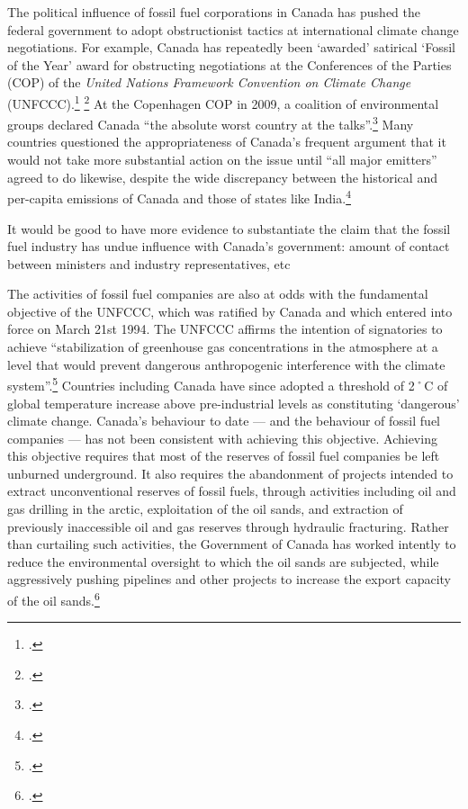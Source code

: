 The political influence of fossil fuel corporations in Canada has pushed the federal government to adopt obstructionist tactics at international climate change negotiations.
For example, Canada has repeatedly been `awarded' satirical `Fossil of the Year' award for obstructing negotiations at the Conferences of the Parties (COP) of the \emph{United Nations Framework Convention on Climate Change} (UNFCCC).\footcite[][]{DurbanFossil} \footcite[See also: ][]{SimpsonBlustering}
At the Copenhagen COP in 2009, a coalition of environmental groups declared Canada ``the absolute worst country at the talks''.\footcite[][]{CBCFossil}
Many countries questioned the appropriateness of Canada's frequent argument that it would not take more substantial action on the issue until ``all major emitters'' agreed to do likewise, despite the wide discrepancy between the historical and per-capita emissions of Canada and those of states like India.\footcite[][]{CanadaWontBudge}



\begin{vcom}
It would be good to have more evidence to substantiate the claim that the fossil fuel industry has undue influence with Canada's government: amount of contact between ministers and industry representatives, etc
\end{vcom}



The activities of fossil fuel companies are also at odds with the fundamental objective of the UNFCCC, which was ratified by Canada and which entered into force on March 21st 1994.
The UNFCCC affirms the intention of signatories to achieve ``stabilization of greenhouse gas concentrations in the atmosphere at a level that would prevent dangerous anthropogenic interference with the climate system''.\footcite[][p. 4]{UNFCCC}
Countries including Canada have since adopted a threshold of 2˚C of global temperature increase above pre-industrial levels as constituting `dangerous' climate change.
Canada's behaviour to date --- and the behaviour of fossil fuel companies --- has not been consistent with achieving this objective.
Achieving this objective requires that most of the reserves of fossil fuel companies be left unburned underground.
It also requires the abandonment of projects intended to extract unconventional reserves of fossil fuels, through activities including oil and gas drilling in the arctic, exploitation of the oil sands, and extraction of previously inaccessible oil and gas reserves through hydraulic fracturing.
Rather than curtailing such activities, the Government of Canada has worked intently to reduce the environmental oversight to which the oil sands are subjected, while aggressively pushing pipelines and other projects to increase the export capacity of the oil sands.\footcite[See: ][]{PeterKentTrail}




